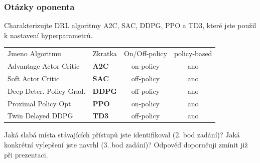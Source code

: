 \begin{frame}
    \frametitle{Otázky oponenta}
    \large{Charakterizujte DRL algoritmy A2C, SAC, DDPG, PPO a TD3, které jste použil k nastavení hyperparametrů.}

    \begin{table}
        \centering
        {\footnotesize
            \begin{tabular}{llcc}
                Jmeno Algoritmu          & Zkratka       & On/Off-policy & policy-based \\

                Advantage Actor Critic   & \textbf{A2C}  & on-policy     & ano          \\
                Soft Actor Critic        & \textbf{SAC}  & off-policy    & ano          \\
                Deep Deter. Policy Grad. & \textbf{DDPG} & off-policy    & ano          \\
                Proximal Policy Opt.     & \textbf{PPO}  & on-policy     & ano          \\
                Twin Delayed DDPG        & \textbf{TD3}  & off-policy    & ano          \\
            \end{tabular}
        }
        \label{tab:algo}
    \end{table}

    \vspace{0.5cm}

    \large{Jaká slabá místa stávajících přístupů jste identifikoval (2. bod zadání)? Jaká konkrétní vylepšení jste navrhl (3. bod zadání)? Odpověď doporučuji zmínit již při prezentaci.}
\end{frame}





